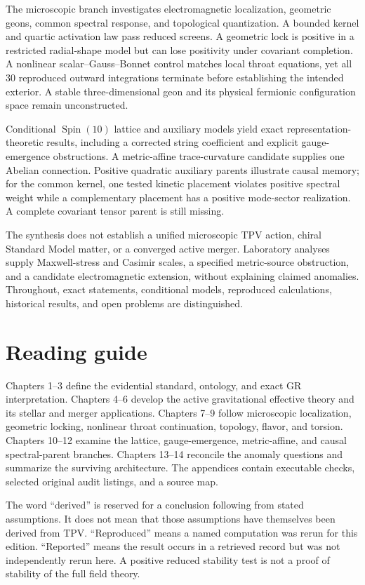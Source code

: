 \documentclass[11pt,oneside]{report}
\newcommand{\Spin}{\operatorname{Spin}}
\begin{document}
The microscopic branch investigates electromagnetic localization, geometric geons, common spectral response, and topological quantization. A bounded kernel and quartic activation law pass reduced screens. A geometric lock is positive in a restricted radial-shape model but can lose positivity under covariant completion. A nonlinear scalar--Gauss--Bonnet control matches local throat equations, yet all 30 reproduced outward integrations terminate before establishing the intended exterior. A stable three-dimensional geon and its physical fermionic configuration space remain unconstructed.

Conditional $\Spin(10)$ lattice and auxiliary models yield exact representation-theoretic results, including a corrected string coefficient and explicit gauge-emergence obstructions. A metric-affine trace-curvature candidate supplies one Abelian connection. Positive quadratic auxiliary parents illustrate causal memory; for the common kernel, one tested kinetic placement violates positive spectral weight while a complementary placement has a positive mode-sector realization. A complete covariant tensor parent is still missing.

The synthesis does not establish a unified microscopic TPV action, chiral Standard Model matter, or a converged active merger. Laboratory analyses supply Maxwell-stress and Casimir scales, a specified metric-source obstruction, and a candidate electromagnetic extension, without explaining claimed anomalies. Throughout, exact statements, conditional models, reproduced calculations, historical results, and open problems are distinguished.

\chapter*{Reading guide}
Chapters 1--3 define the evidential standard, ontology, and exact GR interpretation. Chapters 4--6 develop the active gravitational effective theory and its stellar and merger applications. Chapters 7--9 follow microscopic localization, geometric locking, nonlinear throat continuation, topology, flavor, and torsion. Chapters 10--12 examine the lattice, gauge-emergence, metric-affine, and causal spectral-parent branches. Chapters 13--14 reconcile the anomaly questions and summarize the surviving architecture. The appendices contain executable checks, selected original audit listings, and a source map.

The word ``derived'' is reserved for a conclusion following from stated assumptions. It does not mean that those assumptions have themselves been derived from TPV. ``Reproduced'' means a named computation was rerun for this edition. ``Reported'' means the result occurs in a retrieved record but was not independently rerun here. A positive reduced stability test is not a proof of stability of the full field theory.
\tableofcontents
\clearpage{}
\end{document}
